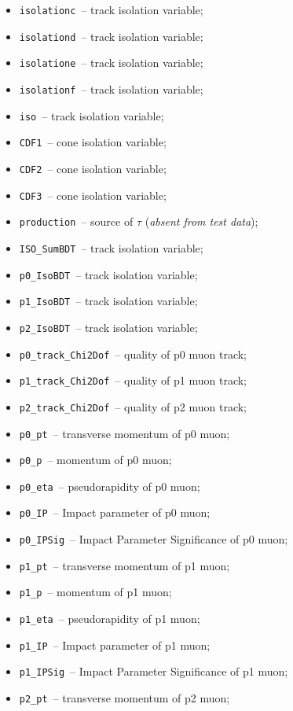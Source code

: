 \documentclass[conference]{IEEEtran}
\begin{document}
\begin{itemize}
	\item \texttt{isolationc}~-- track isolation variable;
	\item \texttt{isolationd}~-- track isolation variable;
	\item \texttt{isolatione}~-- track isolation variable;
	\item \texttt{isolationf}~-- track isolation variable;
	\item \texttt{iso}~-- track isolation variable;
	\item \texttt{CDF1}~-- cone isolation variable;
	\item \texttt{CDF2}~-- cone isolation variable;
	\item \texttt{CDF3}~-- cone isolation variable;
	\item \texttt{production}~-- source of $\tau$ (\textit{absent from test data});
	\item \texttt{ISO\_SumBDT}~-- track isolation variable;
	\item \texttt{p0\_IsoBDT}~-- track isolation variable;
	\item \texttt{p1\_IsoBDT}~-- track isolation variable;
	\item \texttt{p2\_IsoBDT}~-- track isolation variable;
	\item \texttt{p0\_track\_Chi2Dof}~-- quality of p0 muon track;
	\item \texttt{p1\_track\_Chi2Dof}~-- quality of p1 muon track;
	\item \texttt{p2\_track\_Chi2Dof}~-- quality of p2 muon track;
	\item \texttt{p0\_pt}~-- transverse momentum of p0 muon;
	\item \texttt{p0\_p}~-- momentum of p0 muon;
	\item \texttt{p0\_eta}~-- pseudorapidity of p0 muon;
	\item \texttt{p0\_IP}~-- Impact parameter of p0 muon;
	\item \texttt{p0\_IPSig}~-- Impact Parameter Significance of p0 muon;
	\item \texttt{p1\_pt}~-- transverse momentum of p1 muon;
	\item \texttt{p1\_p}~-- momentum of p1 muon;
	\item \texttt{p1\_eta}~-- pseudorapidity of p1 muon;
	\item \texttt{p1\_IP}~-- Impact parameter of p1 muon;
	\item \texttt{p1\_IPSig}~-- Impact Parameter Significance of p1 muon;
	\item \texttt{p2\_pt}~-- transverse momentum of p2 muon;

\end{itemize}
\end{document}
